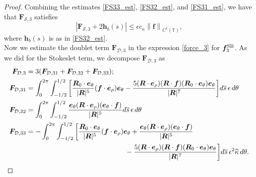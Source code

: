 \documentclass[11pt]{article}
\numberwithin{equation}{section}
\newcommand{\T}{\mathbb{T}}
\newcommand{\bars}{\overline s}
\newcommand{\be}{\bm{e}}
\newcommand{\ts}{\thinspace}
\newcommand{\SB}{{\rm SB}}
\newcommand{\abs}[1]{\left\lvert #1 \right\rvert}
\newcommand{\norm}[1]{\left\lVert #1 \right\rVert}
\newcommand{\wh}[1]{\widehat{#1}}
\newcommand{\mc}[1]{\mathcal{#1}}
\theoremstyle{definition}
\begin{document}
\begin{proof}
%
%

Combining the estimates \eqref{FS33_est}, \eqref{FS32_est}, and \eqref{FS31_est}, we have that $\bm{F}_{\mc{S},3}$ satisfies
\begin{equation}\label{FS3_est}
\abs{\bm{F}_{\mc{S},3}+2\bm{h}_b(s)} \le \epsilon c_\kappa \norm{\bm{f}}_{C^1(\T)},
\end{equation}
where $\bm{h}_b(s)$ is as in \eqref{FS32_est}. \\

Now we estimate the doublet term $\bm{F}_{\mc{D},3}$ in the expression \eqref{force_3} for $\bm{f}^{\SB}_3$. As we did for the Stokeslet term, we decompose $\bm{F}_{\mc{D},3}$ as
\begin{equation}\label{FD3}
\begin{aligned}
\bm{F}_{\mc{D},3} &= 3(\bm{F}_{\mc{D},31} + \bm{F}_{\mc{D},32} + \bm{F}_{\mc{D},33}) ; \\
%
\bm{F}_{\mc{D},31} &= \int_0^{2\pi}\int_{-1/2}^{1/2} \bigg[\frac{\bm{R}_0\cdot\be_{\theta}}{|\bm{R}|^5}({\bm f}\cdot\be_{\rho})\be_\theta -\frac{5(\bm{R}\cdot\be_\rho)(\bm{R}\cdot\bm{f})(\bm{R}_0\cdot\be_{\theta})\be_\theta}{|\bm{R}|^7} \bigg] d\bars \ts \epsilon \ts d\theta \\
%
\bm{F}_{\mc{D},32} &= \int_0^{2\pi}\int_{-1/2}^{1/2} \frac{\be_\theta(\bm{R}\cdot\be_\rho)(\be_{\theta}\cdot\bm{f})}{|\bm{R}|^5} d\bars \ts \epsilon \ts d\theta \\
%
\bm{F}_{\mc{D},33} &= -\int_0^{2\pi}\int_{-1/2}^{1/2} \bigg[\frac{\bm{R}_0\cdot\be_{\theta}}{|\bm{R}|^5}({\bm f}\cdot\be_{\rho})\be_\theta + \frac{\be_\theta(\bm{R}\cdot\be_\rho)(\be_{\theta}\cdot\bm{f})}{|\bm{R}|^5} \\
&\hspace{5cm} -\frac{5(\bm{R}\cdot\be_\rho)(\bm{R}\cdot\bm{f})(\bm{R}_0\cdot\be_{\theta})\be_\theta}{|\bm{R}|^7} \bigg] d\bars \ts \epsilon^2\wh\kappa \ts d\theta.
\end{aligned}
\end{equation}


\end{proof}
\end{document}
